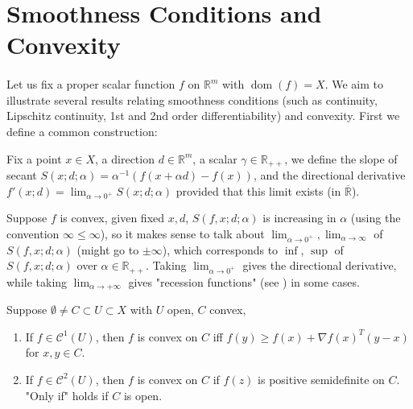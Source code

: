 \section{Smoothness Conditions and Convexity}
\label{sect:022}

\paragraph{}Let us fix a proper scalar function $f$ on $\mathbb{R}^m$ with $\operatorname{dom}(f)=X$. We aim to illustrate several results relating smoothness conditions (such as continuity, Lipschitz continuity, 1st and 2nd order differentiability) and convexity. First we define a common construction:

\begin{defn}\label{defn:022-secant-slope}
	Fix a point $x\in X$, a direction $d\in \mathbb{R}^m$, a scalar $\gamma \in \mathbb{R}_{++}$, we define the slope of secant $S(x; d; \alpha)=\alpha^{-1}(f(x+\alpha d)-f(x))$, and the directional derivative $f'(x; d)=\lim_{\alpha \to 0^+}S(x;d; \alpha )$ provided that this limit exists (in $\overline{\mathbb{R}}$).
\end{defn}

\begin{rmrk}Suppose $f$ is convex, given fixed $x, d$, $S(f,x; d; \alpha)$ is increasing in $\alpha$ (using the convention $\infty\leq \infty$), so it makes sense to talk about $\lim_{\alpha \to0^+},\lim_{\alpha \to\infty}$ of $S(f,x; d; \alpha )$ (might go to $\pm\infty$), which corresponds to $\inf$, $\sup$ of $S(f,x; d; \alpha )$ over $\alpha \in \mathbb{R}_{++}$. Taking $\lim_{\alpha \to 0^+}$ gives the directional derivative, while taking $\lim_{\alpha \to +\infty}$ gives "recession functions" (see ) in some cases.
\end{rmrk}

\begin{prop}
	\label{prop:022-ordered-conditions-convexity}
	Suppose $\emptyset\neq C\subset U\subset X$ with $U$ open, $C$ convex,
	\begin{enumerate}[label=(\alph*)]
		\item If $f\in\mathscr{C}^1(U)$, then $f$ is convex on $C$ iff $f(y)\geq f(x)+\nabla f(x)^T(y-x)$ for $x,y\in C$.
		\item If $f\in\mathscr{C}^2(U)$, then $f$ is convex on $C$ if $f(z)$ is positive semidefinite on $C$. "Only if" holds if $C$ is open.
	\end{enumerate}
\end{prop}

